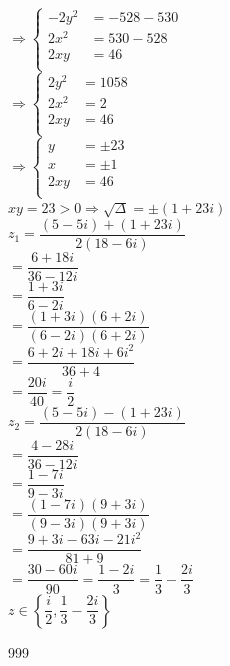 \documentclass[a4paper]{article}
\begin{document}
$\Rightarrow \left\{
\begin{array}{lll}
-2y^2 &= -528 - 530    \\

2x^2 &= 530 -528  \\

2xy &= 46   \\
\end{array}
\right .$\\

$\Rightarrow \left\{
\begin{array}{lll}
2y^2 &= 1058    \\

2x^2 &= 2  \\

2xy &= 46   \\
\end{array}
\right .$\\

$\Rightarrow \left\{
\begin{array}{lll}
y &= \pm 23    \\

x &= \pm 1  \\

2xy &= 46   \\
\end{array}
\right .$\\

$xy = 23 > 0 \Rightarrow \sqrt{\Delta} = \pm (1+23i)$ \\

$z_1 = \dfrac{(5-5i) + (1+23i)}{2(18-6i)}$ \\

$= \dfrac{6 + 18i}{36 - 12i}$ \\

$= \dfrac{1 + 3i}{6 - 2i}$ \\

$= \dfrac{(1 + 3i)(6 + 2i)}{(6 - 2i)(6 + 2i)}$ \\

$= \dfrac{6 + 2i + 18i + 6i^2}{36 + 4}$ \\

$= \dfrac{20i}{40} = \dfrac{i}{2}$ \\

$z_2 = \dfrac{(5-5i) - (1+23i)}{2(18-6i)}$ \\

$= \dfrac{4 - 28i}{36 - 12i}$ \\

$= \dfrac{1 - 7i}{9 - 3i}$ \\

$= \dfrac{(1 - 7i)(9 + 3i)}{(9 - 3i)(9 + 3i)}$ \\

$= \dfrac{9 + 3i - 63i - 21i^2}{81 + 9}$ \\

$= \dfrac{30 - 60i}{90} = \dfrac{1 - 2i}{3} = \dfrac{1}{3} -  \dfrac{2i}{3} $\\

$z \in \left\{\dfrac{i}{2}, \dfrac{1}{3} - \dfrac{2i}{3} \right\}$ \\


\begin{thebibliography}{999}
\end{thebibliography}
\end{document}
